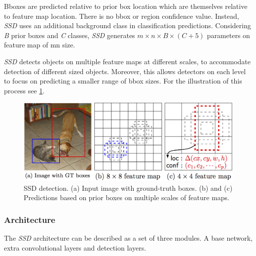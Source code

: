 Bboxes are predicted relative to prior box location which are themselves relative to feature map location. There is no bbox or region confidence value. Instead, \textit{SSD} uses an additional background class in classification predictions. Considering \textit{B} prior boxes and \textit{C} classes, \textit{SSD} generates $m\times n\times B\times (C+5)$ parameters on feature map of m\x n size.

\textit{SSD} detects objects on multiple feature maps at different scales, to accommodate detection of different sized objects. Moreover, this allows detectors on each level to focus on predicting a smaller range of bbox sizes. For the illustration of this process see \cref{fig:ssddet}.

\begin{figure}
    \centering
    \includegraphics[width=\textwidth]{img/ssddet}
    \caption{SSD detection. (a) Input image with ground-truth boxes. (b) and (c) Predictions based on prior boxes on multiple scales of feature maps.}
    \label{fig:ssddet}
\end{figure}

\subsubsection{Architecture}
The \textit{SSD} architecture can be described as a set of three modules. A base network, extra convolutional layers and detection layers.


